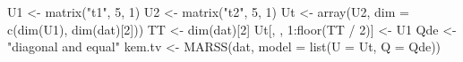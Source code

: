 \begin{Schunk}
\begin{Sinput}
 U1 <- matrix("t1", 5, 1)
 U2 <- matrix("t2", 5, 1)
 Ut <- array(U2, dim = c(dim(U1), dim(dat)[2]))
 TT <- dim(dat)[2]
 Ut[, , 1:floor(TT / 2)] <- U1
 Qde <- "diagonal and equal"
 kem.tv <- MARSS(dat, model = list(U = Ut, Q = Qde))
\end{Sinput}
\end{Schunk}
